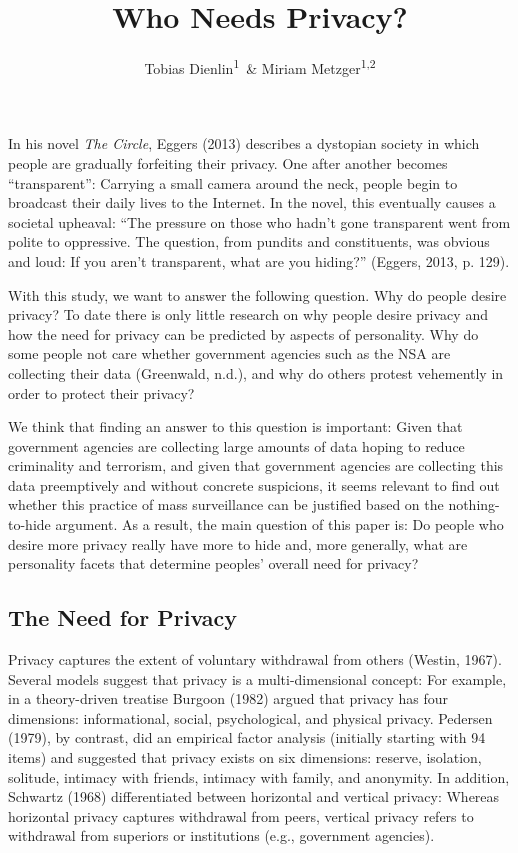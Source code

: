 \documentclass[man,floatsintext]{apa6}
\title{Who Needs Privacy?}
\author{Tobias Dienlin\textsuperscript{1}~\& Miriam Metzger\textsuperscript{1,2}}
\date{}
\affiliation{
\vspace{0.5cm}
\textsuperscript{1} University of Hohenheim\\\textsuperscript{2} University of California, Santa Barbara}
\theoremstyle{definition}
\theoremstyle{definition}
\theoremstyle{definition}
\theoremstyle{remark}
\begin{document}
\maketitle















In his novel \emph{The Circle}, Eggers (2013) describes a dystopian
society in which people are gradually forfeiting their privacy. One
after another becomes \enquote{transparent}: Carrying a small camera
around the neck, people begin to broadcast their daily lives to the
Internet. In the novel, this eventually causes a societal upheaval:
\enquote{The pressure on those who hadn't gone transparent went from
polite to oppressive. The question, from pundits and constituents, was
obvious and loud: If you aren't transparent, what are you hiding?}
(Eggers, 2013, p. 129).

With this study, we want to answer the following question. Why do people
desire privacy? To date there is only little research on why people
desire privacy and how the need for privacy can be predicted by aspects
of personality. Why do some people not care whether government agencies
such as the NSA are collecting their data (Greenwald, n.d.), and why do
others protest vehemently in order to protect their privacy?

We think that finding an answer to this question is important: Given
that government agencies are collecting large amounts of data hoping to
reduce criminality and terrorism, and given that government agencies are
collecting this data preemptively and without concrete suspicions, it
seems relevant to find out whether this practice of mass surveillance
can be justified based on the nothing-to-hide argument. As a result, the
main question of this paper is: Do people who desire more privacy really
have more to hide and, more generally, what are personality facets that
determine peoples' overall need for privacy?

\hypertarget{the-need-for-privacy}{%
\subsection{The Need for Privacy}\label{the-need-for-privacy}}

Privacy captures the extent of voluntary withdrawal from others (Westin,
1967). Several models suggest that privacy is a multi-dimensional
concept: For example, in a theory-driven treatise Burgoon (1982) argued
that privacy has four dimensions: informational, social, psychological,
and physical privacy. Pedersen (1979), by contrast, did an empirical
factor analysis (initially starting with 94 items) and suggested that
privacy exists on six dimensions: reserve, isolation, solitude, intimacy
with friends, intimacy with family, and anonymity. In addition, Schwartz
(1968) differentiated between horizontal and vertical privacy: Whereas
horizontal privacy captures withdrawal from peers, vertical privacy
refers to withdrawal from superiors or institutions (e.g., government
agencies).
\end{document}
